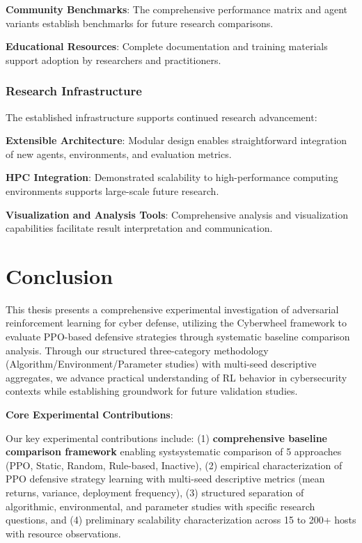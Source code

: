 \documentclass[12pt,oneside,a4paper]{article}
\theoremstyle{definition}
\theoremstyle{plain}
\begin{document}
\textbf{Community Benchmarks}: The comprehensive performance matrix and agent variants establish benchmarks for future research comparisons.

\textbf{Educational Resources}: Complete documentation and training materials support adoption by researchers and practitioners.

\subsubsection{Research Infrastructure}
The established infrastructure supports continued research advancement:

\textbf{Extensible Architecture}: Modular design enables straightforward integration of new agents, environments, and evaluation metrics.

\textbf{HPC Integration}: Demonstrated scalability to high-performance computing environments supports large-scale future research.

\textbf{Visualization and Analysis Tools}: Comprehensive analysis and visualization capabilities facilitate result interpretation and communication.

\section{Conclusion}

This thesis presents a comprehensive experimental investigation of adversarial reinforcement learning for cyber defense, utilizing the Cyberwheel framework to evaluate PPO-based defensive strategies through systematic baseline comparison analysis. Through our structured three-category methodology (Algorithm/Environment/Parameter studies) with multi-seed descriptive aggregates, we advance practical understanding of RL behavior in cybersecurity contexts while establishing groundwork for future validation studies.

\textbf{Core Experimental Contributions}:

Our key experimental contributions include: (1) \textbf{comprehensive baseline comparison framework} enabling systsystematic comparison of 5 approaches (PPO, Static, Random, Rule-based, Inactive), (2) empirical characterization of PPO defensive strategy learning with multi-seed descriptive metrics (mean returns, variance, deployment frequency), (3) structured separation of algorithmic, environmental, and parameter studies with specific research questions, and (4) preliminary scalability characterization across 15 to 200+ hosts with resource observations.
\end{document}
